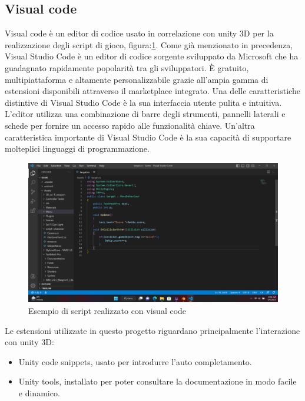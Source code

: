 \documentclass[
a4paper,
cleardoublepage=empty,
headings=twolinechapter,
numbers=autoenddot,
]{scrbook}
\begin{document}
	\subsection{Visual code}
	Visual code è un editor di codice usato in correlazione con unity 3D per la realizzazione degli script di gioco, figura:\ref{fig:visual_code}.
    Come già menzionato in precedenza, Visual Studio Code è un editor di codice sorgente sviluppato da Microsoft che ha guadagnato rapidamente popolarità tra gli sviluppatori. È gratuito, multipiattaforma e altamente personalizzabile grazie all'ampia gamma di estensioni disponibili attraverso il marketplace integrato.
	Una delle caratteristiche distintive di Visual Studio Code è la sua interfaccia utente pulita e intuitiva. L'editor utilizza una combinazione di barre degli strumenti, pannelli laterali e schede per fornire un accesso rapido alle funzionalità chiave.
	Un'altra caratteristica importante di Visual Studio Code è la sua capacità di supportare molteplici linguaggi di programmazione.
	\begin{figure}[H]
		\centering
		\includegraphics[width=0.8\linewidth]{image/visual_code}
		\caption{Esempio di script realizzato con visual code}
		\label{fig:visual_code}
	\end{figure}
	Le estensioni utilizzate in questo progetto riguardano principalmente l'interazione con unity 3D:
	\begin{itemize}
		\item Unity code snippets\cite{code-snippets}, usato per introdurre l'auto completamento.
		\item Unity tools\cite{UnityTools}, installato per poter consultare la documentazione in modo facile e dinamico. 
	\end{itemize}
	
\end{document}
